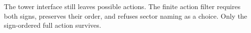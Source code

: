 \documentclass[11pt]{article}
\begin{document}
\begin{code}
\AgdaSymbol{=}\AgdaSpace{}%
\<%
\\
%
\>[2]\AgdaSymbol{;}\AgdaSpace{}%
%
\>[24]\AgdaSymbol{=}\AgdaSpace{}%
\<%
\\
%
\>[2]\AgdaSymbol{;}\AgdaSpace{}%
%
\>[24]\AgdaSymbol{=}\AgdaSpace{}%
\<%
\\
%
\>[2]\AgdaSymbol{;}\AgdaSpace{}%
%
\>[24]\AgdaSymbol{=}\AgdaSpace{}%
\<%
\\
%
\>[2]\AgdaSymbol{;}\AgdaSpace{}%
%
\>[24]\AgdaSymbol{=}\AgdaSpace{}%
\<%
\\
%
\>[2]\AgdaSymbol{\}}\<%
\end{code}

The tower interface still leaves possible actions.  The finite action filter
requires both signs, preserves their order, and refuses sector naming as a
choice.  Only the sign-ordered full action survives.
\end{document}
